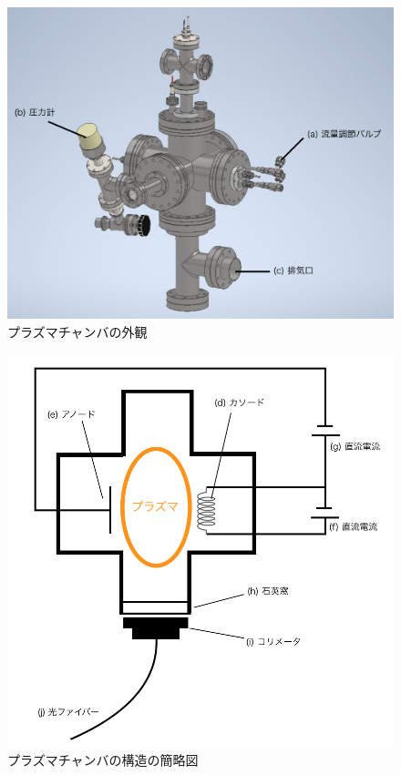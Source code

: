 \listoffigures
{}

\begin{figure}
    \centering
    \includegraphics[width=15cm]{pictures/chamber-picture.png}
    \caption{プラズマチャンバの外観}
    \label{fig:chamber-picture}
\end{figure}

\begin{figure}
    \centering
    \includegraphics[width=15cm]{pictures/chamber-simple.png}
    \caption{プラズマチャンバの構造の簡略図}
    \label{fig:chamber-simple}
\end{figure}

